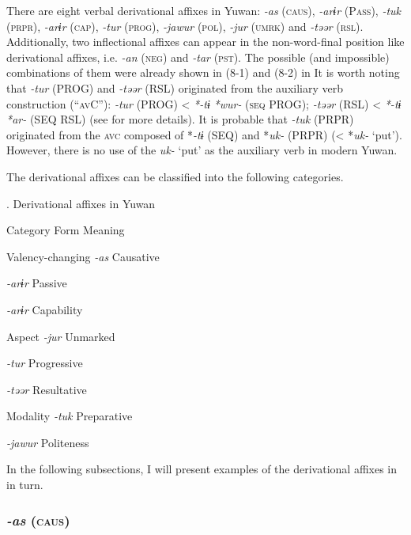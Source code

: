 There are eight verbal derivational affixes in Yuwan: \textit{{}-as} (\textsc{caus}), \textit{{}-arɨr} (P\textsc{ass}), \textit{{}-tuk} (\textsc{prpr}), \textit{-arɨr} (\textsc{cap}), \textit{{}-tur} (\textsc{prog}), \textit{{}-jawur} (\textsc{pol}), \textit{-jur} (\textsc{umrk}) and \textit{{}-təər} (\textsc{rsl}). Additionally, two inflectional affixes can appear in the non-word-final position like derivational affixes, i.e. \textit{{}-an} (\textsc{neg}) and \textit{{}-tar} (\textsc{pst}). The possible (and impossible) combinations of them were already shown in (8-1) and (8-2) in  It is worth noting that \textit{-tur} (PROG) and \textit{{}-təər} (RSL) originated from the auxiliary verb construction (“\textsc{av}C”): \textit{{}-tur} (PROG) < \textit{*-tɨ} \textit{*wur-} (\textsc{seq} PROG); \textit{{}-təər} (RSL) < \textit{*-tɨ} \textit{*ar-} (SEQ RSL) (see  for more details). It is probable that \textit{{}-tuk} (PRPR) originated from the \textsc{avc} composed of *\textit{{}-tɨ} (SEQ) and *\textit{uk-} (PRPR) (< *\textit{uk-} ‘put’). However, there is no use of the \textit{uk-} ‘put’ as the auxiliary verb in modern Yuwan.

  The derivational affixes can be classified into the following categories.

\begin{styleBeschriftung}
\textmd{}\textmd{. Derivational affixes in Yuwan}
\end{styleBeschriftung}

Category  Form  Meaning

Valency-changing  \textit{{}-as} Causative

  \textit{{}-arɨr} Passive

  \textit{{}-arɨr} Capability

Aspect  \textit{{}-jur} Unmarked

  \textit{{}-tur} Progressive

  \textit{{}-təər} Resultative

Modality  \textit{{}-tuk} Preparative

  \textit{{}-jawur} Politeness

In the following subsections, I will present examples of the derivational affixes in  in turn.

\subsubsection{\textit{{}-as} (\textsc{caus})}


